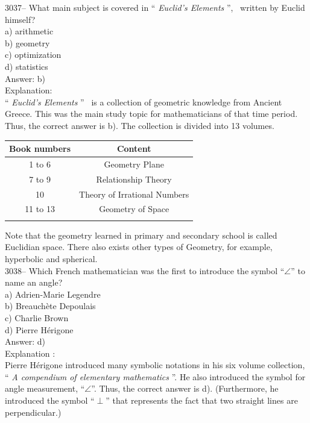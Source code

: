 \documentclass[letterpaper, 12pt]{article}
\begin{document}
3037-- What main subject is covered in `` \emph{Euclid's Elements} '', \ written by Euclid himself?\\

a) arithmetic\\
b) geometry\\
c) optimization\\
d) statistics\\

Answer: b)\\

Explanation:\\
`` \emph{Euclid's Elements} '' \ is a collection of geometric knowledge from Ancient Greece. This was the main study topic for mathematicians of that time period. Thus, the correct answer is b). The collection is divided into 13 volumes.\\
\begin{center}
\begin{tabular}{|c|c|} \hline
{\bf Book numbers} & {\bf Content} \\ \hline \hline
1 to 6 & Geometry Plane \\ \hline
7 to 9 & Relationship Theory \\ \hline
10 & Theory of Irrational Numbers \\ \hline
11 to 13 & Geometry of Space \\ \hline
\multicolumn{2}{c}{}
\end{tabular}
\end{center}
Note that the geometry learned in primary and secondary school is called Euclidian space. There also exists other types of Geometry, for example, hyperbolic and spherical.\\



3038-- Which French mathematician was the first to introduce the symbol ``$\angle$'' to name an angle?\\

a) Adrien-Marie Legendre\\
b) Breauch\`ete Depoulais\\
c) Charlie Brown\\
d) Pierre H\'erigone\\

Answer: d)\\

Explanation :\\
Pierre H\'erigone introduced many symbolic notations in his six volume collection, `` \emph{A compendium of elementary mathematics} ''. He also introduced the symbol for angle measurement, ``$\angle$''. Thus, the correct answer is d). (Furthermore, he introduced the symbol ``$\perp$'' that represents the fact that two straight lines are perpendicular.)\\
\end{document}
